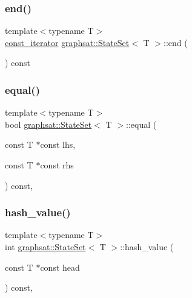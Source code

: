 \subsubsection{\texorpdfstring{end()}{end()}\hspace{0.1cm}{\footnotesize\ttfamily [2/2]}}
{\footnotesize\ttfamily template$<$typename T$>$ \\
\mbox{\hyperlink{classgraphsat_1_1_state_set_1_1const__iterator}{const\+\_\+iterator}} \mbox{\hyperlink{classgraphsat_1_1_state_set}{graphsat\+::\+State\+Set}}$<$ T $>$\+::end (\begin{DoxyParamCaption}{ }\end{DoxyParamCaption}) const\hspace{0.3cm}{\ttfamily [inline]}}

\mbox{\label{classgraphsat_1_1_state_set_ac293557e5cfc90cea8c75ee76a3d56cb}} 
\subsubsection{\texorpdfstring{equal()}{equal()}}
{\footnotesize\ttfamily template$<$typename T$>$ \\
bool \mbox{\hyperlink{classgraphsat_1_1_state_set}{graphsat\+::\+State\+Set}}$<$ T $>$\+::equal (\begin{DoxyParamCaption}\item[{const T $\ast$const}]{lhs,  }\item[{const T $\ast$const}]{rhs }\end{DoxyParamCaption}) const\hspace{0.3cm}{\ttfamily [inline]}, {\ttfamily [private]}}

\mbox{\label{classgraphsat_1_1_state_set_aaf7bbbad618682dd6d747b1c388d4995}} 
\subsubsection{\texorpdfstring{hash\_value()}{hash\_value()}}
{\footnotesize\ttfamily template$<$typename T$>$ \\
int \mbox{\hyperlink{classgraphsat_1_1_state_set}{graphsat\+::\+State\+Set}}$<$ T $>$\+::hash\+\_\+value (\begin{DoxyParamCaption}\item[{const T $\ast$const}]{head }\end{DoxyParamCaption}) const\hspace{0.3cm}{\ttfamily [inline]}, {\ttfamily [private]}}

